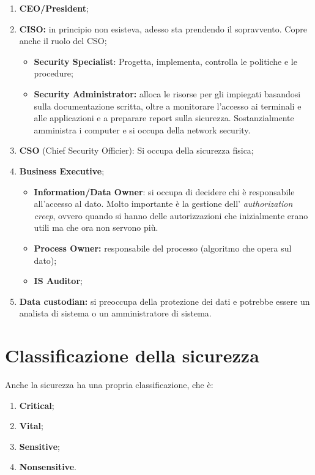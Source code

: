 \begin{enumerate}
  \item \textbf{CEO/President};
  \item \textbf{CISO:} in principio non esisteva, adesso sta prendendo il 
  sopravvento.
Copre anche il ruolo del CSO;
  \begin{itemize}
        \item \textbf{Security Specialist}: Progetta, implementa, 
        controlla le politiche e le procedure;
        \item \textbf{Security Administrator:} alloca le risorse per gli 
        impiegati basandosi sulla documentazione scritta, oltre a monitorare 
        l'accesso ai terminali e alle applicazioni e a preparare report sulla 
        sicurezza. Sostanzialmente amministra i computer e si occupa
        della network security.
  \end{itemize}
  \item \textbf{CSO} (Chief Security Officier): Si occupa della 
  sicurezza fisica;
  \item \textbf{Business Executive};
  \begin{itemize}
  \item \textbf{Information/Data Owner}: si occupa di decidere chi è 
  responsabile all'accesso al dato. Molto importante è la gestione dell'
  \textit{authorization creep}, ovvero quando si hanno delle autorizzazioni 
  che inizialmente erano 
  utili ma che ora non servono più.
  \item \textbf{Process Owner:} responsabile del processo (algoritmo che opera 
  sul dato);
  \item \textbf{IS Auditor};
  \end{itemize}
  \item \textbf{Data custodian:} si preoccupa della protezione dei dati e 
  potrebbe essere un analista di sistema o un amministratore di sistema.
\end{enumerate}

\section{Classificazione della sicurezza}

Anche la sicurezza ha una propria classificazione, che è:
\begin{enumerate}
  \item \textbf{Critical};
  \item \textbf{Vital};
  \item \textbf{Sensitive};
  \item \textbf{Nonsensitive}.
\end{enumerate}

